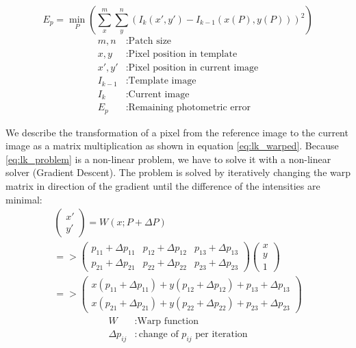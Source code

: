 \documentclass[11pt,a4paper,titlepage,oneside]{report}
\begin{document}
\begin{equation}\label{eq:lk_problem}
  E_p=\min_P(\sum_x^m\sum_y^n(I_{k}(x',y')-I_{k-1}(x(P),y(P)))^2)
\end{equation}
\begin{align*}
  m,n       &: \text{Patch size}\\
  x,y       &: \text{Pixel position in template}\\
  x',y'     &: \text{Pixel position in current image}\\
  I_{k-1}   &: \text{Template image}\\
  I_{k}     &: \text{Current image}\\
  E_p       &: \text{Remaining photometric error}
\end{align*}

We describe the transformation of a pixel from the reference image to the current image as a matrix multiplication as shown in equation \ref{eq:lk_warped}. Because \ref{eq:lk_problem} is a non-linear problem, we have to solve it with a non-linear solver (Gradient Descent). The problem is solved by iteratively changing the warp matrix in direction of the gradient until the difference of the intensities are minimal:
\begin{equation}\label{eq:lk_warped}
  \begin{gathered}
    \begin{pmatrix}
      x' \\
      y'
    \end{pmatrix}=
    W(x;P+\Delta P)\\
    =>
    \begin{pmatrix}
      p_{11}+\Delta p_{11} & p_{12}+\Delta p_{12} & p_{13}+\Delta p_{13} \\
      p_{21}+\Delta p_{21} & p_{22}+\Delta p_{22} & p_{23}+\Delta p_{23}
    \end{pmatrix}
    \begin{pmatrix}
      x\\
      y\\
      1
    \end{pmatrix}\\
    =>
    \begin{pmatrix}
      x(p_{11}+\Delta p_{11}) + y(p_{12}+\Delta p_{12}) + p_{13}+\Delta p_{13} \\
      x(p_{21}+\Delta p_{21}) + y(p_{22}+\Delta p_{22}) + p_{23}+\Delta p_{23}
    \end{pmatrix}
  \end{gathered}
\end{equation}
\begin{align*}
  W               &: \text{Warp function}\\
  \Delta p_{ij}   &: \text{change of $p_{ij}$ per iteration}
\end{align*}
\end{document}
